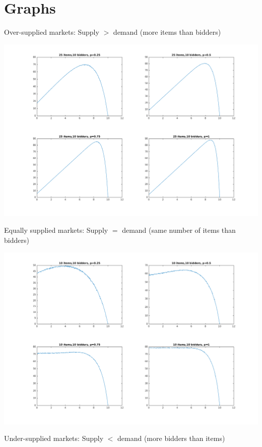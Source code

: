 \documentclass[letterpaper,12pt]{article}
\theoremstyle{plain}
\theoremstyle{definition}
\theoremstyle{remark}
\begin{document}
\section{Graphs}
Over-supplied markets: Supply $>$ demand (more items than bidders)

\hspace*{-0.75in}\includegraphics[width=38em]{../unit-demand/unitdemand-25-10.png}

Equally supplied markets: Supply $=$ demand (same number of items than bidders)

\hspace*{-0.75in}\includegraphics[width=38em]{../unit-demand/unitdemand-10-10.png}

Under-supplied markets: Supply $<$ demand (more bidders than items)
\end{document}

